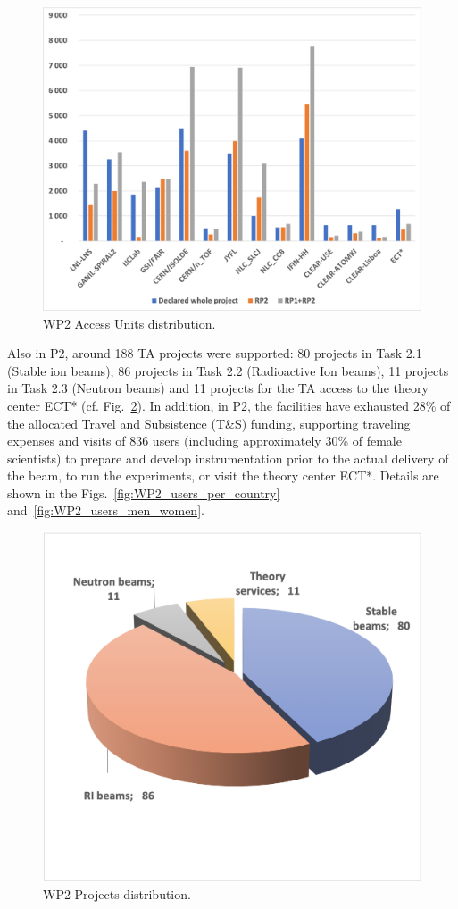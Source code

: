 \begin{figure}[!h]
    \centering
    \includegraphics[width=0.8\linewidth]{graphics/WP2_AU_statistics.png}
    \caption{WP2 Access Units distribution.}
    \label{fig:WP2_AU_statistics}
\end{figure}

Also in P2, around 188 TA projects were supported: 80 projects in Task 2.1 (Stable ion beams), 86 projects in Task 2.2 (Radioactive Ion beams), 11 projects in Task 2.3 (Neutron beams) and 11 projects for the TA access to the theory center ECT* (cf. Fig.~\ref{fig:WP2_projects}).  In addition, in P2, the facilities have exhausted 28\% of the allocated Travel and Subsistence (T\&S) funding, supporting traveling expenses and visits of 836 users (including approximately 30\% of female scientists) to prepare and develop instrumentation prior to the actual delivery of the beam, to run the experiments, or visit the theory center ECT*. Details are shown in the Figs.~\ref{fig:WP2_users_per_country} and~\ref{fig:WP2_users_men_women}. 

\begin{figure}[!h]
    \centering
    \includegraphics[width=0.7\linewidth]{graphics/WP2_projects.png}
    \caption{WP2 Projects distribution.}
    \label{fig:WP2_projects}
\end{figure}


